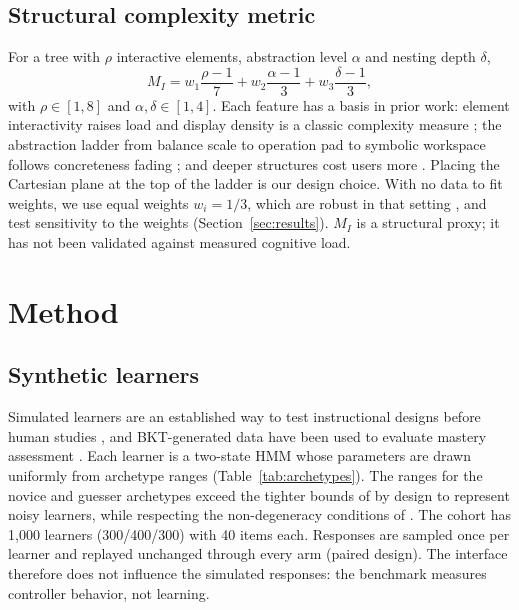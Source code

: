 \documentclass[conference]{IEEEtran}
\begin{document}
\subsection{Structural complexity metric}
For a tree with $\rho$ interactive elements, abstraction level $\alpha$ and
nesting depth $\delta$,
\begin{equation}
M_I = w_1\frac{\rho-1}{7} + w_2\frac{\alpha-1}{3} + w_3\frac{\delta-1}{3},
\end{equation}
with $\rho\in[1,8]$ and $\alpha,\delta\in[1,4]$.
Each feature has a basis in prior work: element interactivity raises load \cite{sweller2010element}
and display density is a classic complexity measure \cite{tullis1983formatting};
the abstraction ladder from balance scale to operation pad to symbolic
workspace follows concreteness fading \cite{fyfe2014concreteness}; and
deeper structures cost users more \cite{kiger1984depth}.
Placing the Cartesian plane at the top of the ladder is our design choice.
With no data to fit weights, we use equal weights $w_i=1/3$, which are robust
in that setting \cite{dawes1979robust}, and test sensitivity to the weights
(Section~\ref{sec:results}). $M_I$ is a structural proxy; it has not been
validated against measured cognitive load.

\section{Method}
\label{sec:method}

\subsection{Synthetic learners}
Simulated learners are an established way to test instructional designs
before human studies \cite{vanlehn1994simulated,kaser2024simulated}, and
BKT-generated data have been used to evaluate mastery assessment
\cite{fancsali2013optimal}. Each learner is a two-state
HMM whose parameters are drawn uniformly from archetype ranges
(Table~\ref{tab:archetypes}). The ranges for the novice and guesser
archetypes exceed the tighter bounds of \cite{corbett1995knowledge} by design
to represent noisy learners, while respecting the non-degeneracy conditions
of \cite{vandesande2013properties}. The cohort has 1,000 learners
(300/400/300) with 40 items each. Responses are sampled once per learner and
replayed unchanged through every arm (paired design). The interface therefore
does not influence the simulated responses: the benchmark measures controller
behavior, not learning.
\end{document}

